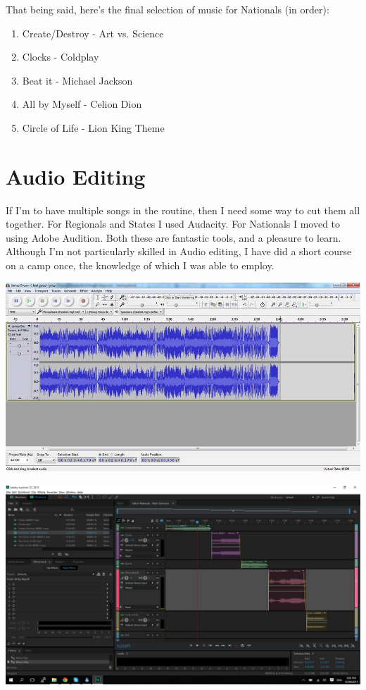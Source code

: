             That being said, here's the final selection of music for Nationals (in order):\\
            
            \begin{enumerate}
            	\item Create/Destroy - Art vs. Science
                \item Clocks - Coldplay
                \item Beat it - Michael Jackson
                \item All by Myself - Celion Dion
                \item Circle of Life - Lion King Theme
            \end{enumerate}
            
		\section{Audio Editing}
            \label{audio_editing}
        	If I'm to have multiple songs in the routine, then I need some way to cut them all together. For Regionals and States I used Audacity. For Nationals I moved to using Adobe Audition. Both these are fantastic tools, and a pleasure to learn. Although I'm not particularly skilled in Audio editing, I have did a short course on a camp once, the knowledge of which I was able to employ.\\
            
            \centerline{\includegraphics[width=0.75\linewidth]{images/audio_editing}}
            \vspace{10pt}
            
            \centerline{\includegraphics[width=0.75\linewidth]{images/audition_audio_editing}}
            \vspace{10pt}                        
            
